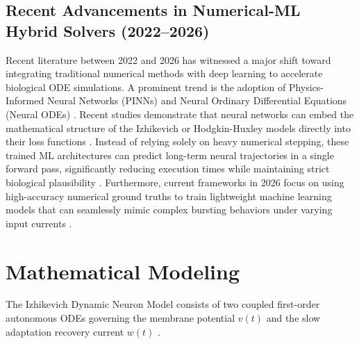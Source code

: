 \documentclass[conference]{IEEEtran}
\begin{document}
\subsection{Recent Advancements in Numerical-ML Hybrid Solvers (2022--2026)}
Recent literature between 2022 and 2026 has witnessed a major shift toward integrating traditional numerical methods with deep learning to accelerate biological ODE simulations. A prominent trend is the adoption of Physics-Informed Neural Networks (PINNs) and Neural Ordinary Differential Equations (Neural ODEs) \cite{cuomo}. Recent studies demonstrate that neural networks can embed the mathematical structure of the Izhikevich or Hodgkin-Huxley models directly into their loss functions \cite{cuomo}. Instead of relying solely on heavy numerical stepping, these trained ML architectures can predict long-term neural trajectories in a single forward pass, significantly reducing execution times while maintaining strict biological plausibility \cite{lu}. Furthermore, current frameworks in 2026 focus on using high-accuracy numerical ground truths to train lightweight machine learning models that can seamlessly mimic complex bursting behaviors under varying input currents \cite{lu}.

\begin{table}[htbp]
\centering
\caption{Comparative Summary of Dynamic Neuron Models and Numerical Integration Schemes}
\label{tab1}
\end{table}

\section{Mathematical Modeling}

The Izhikevich Dynamic Neuron Model consists of two coupled first-order autonomous ODEs governing the membrane potential $v(t)$ and the slow adaptation recovery current $w(t)$ \cite{schiesser}. 
\end{document}
